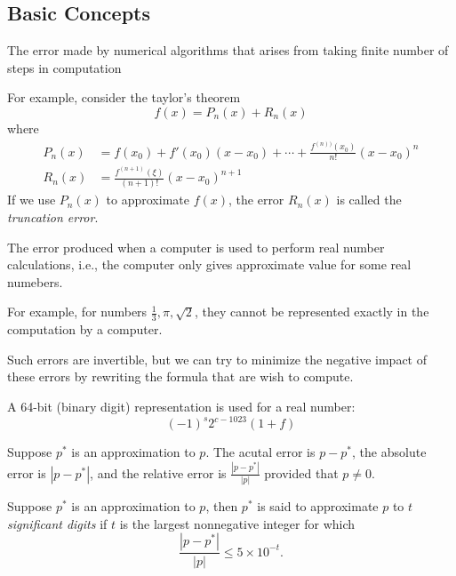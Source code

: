 \subsection{Basic Concepts}
\begin{definition}
The error made by numerical algorithms that arises from taking finite number of steps in computation
\end{definition}
For example, consider the taylor's theorem
\[
f(x)=P_n(x)+R_n(x)
\]
where
\begin{align*}
P_n(x)&=f(x_0)+f'(x_0)(x-x_0)+\cdots+\frac{f^{(n))}(x_0)}{n!}(x-x_0)^n\\
R_n(x)&=\frac{f^{(n+1)}(\xi)}{(n+1)!}(x-x_0)^{n+1}
\end{align*}
If we use $P_n(x)$ to approximate $f(x)$, the error $R_n(x)$ is called the \emph{truncation error}.

\begin{definition}
The error produced when a computer is used to
perform real number calculations, i.e., the computer only gives approximate value for some real numebers.
\end{definition}

For example, for numbers $\frac{1}{3},\pi,\sqrt{2}$, they cannot be represented exactly in the computation by a computer.

Such errors are invertible, but  we can try to minimize the negative impact of these errors by rewriting the formula that are wish to compute.

\begin{definition}
A 64-bit (binary digit) representation is used for a real number:
\[
(-1)^s2^{c-1023}(1+f)
\]
\end{definition}




\begin{definition}
Suppose $p^*$ is an approximation to $p$. The acutal error is $p-p^*$, the absolute error is $|p-p^*|$, and the relative error is $\frac{|p-p^*|}{|p|}$ provided that $p\ne0$.
\end{definition}
\begin{definition}
Suppose $p^*$ is an approximation to $p$, then $p^*$ is said to approximate $p$ to $t$ \emph{significant digits} if $t$ is the largest nonnegative integer for which
\[
\frac{|p-p^*|}{|p|}\le5\times 10^{-t}.
\]
\end{definition}


